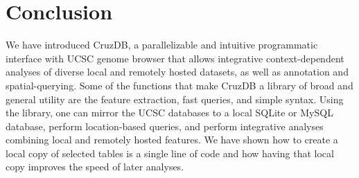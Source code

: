\documentclass{bioinfo}
\begin{document}
%
%



\section{Conclusion}
We have introduced CruzDB, a parallelizable and intuitive programmatic interface with UCSC genome browser that allows integrative context-dependent analyses of diverse local and remotely hosted datasets, as well as annotation and spatial-querying. Some of the functions that make CruzDB a library of broad and general utility are the feature extraction, fast queries, and simple syntax.
Using the library, one can mirror the UCSC databases to a local SQLite or MySQL database, perform location-based queries, and perform integrative analyses combining local and remotely hosted features. We have shown how to create a local copy of selected tables is a single line of code and how having that local copy improves the speed of later analyses.






%
%
%
%
%
%
%
% 




  
\end{document}
